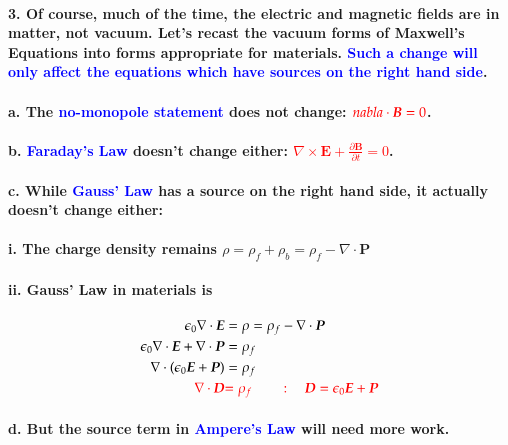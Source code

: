 \documentclass{article}
\begin{document}
\paragraph{3. Of course, much of the time, the electric and magnetic fields are in matter, not vacuum. Let's recast the vacuum forms of Maxwell's Equations into forms appropriate for materials. \textcolor{blue}{Such a change will only affect the equations which have sources on the right hand side}.}
\paragraph{\indent a. The \textcolor{blue}{no-monopole statement} does not change: $\textcolor{red}{nabla\cdot\boldsymbol{B}=0}$.}
\paragraph{\indent b. \textcolor{blue}{Faraday's Law} doesn't change either: \textcolor{red}{$\nabla\times\boldsymbol{E}+\frac{\partial\boldsymbol{B}}{\partial t}=0$}.}
\paragraph{\indent c. While \textcolor{blue}{Gauss' Law} has a source on the right hand side, it actually doesn't change either:}
\paragraph{\indent\indent i. The charge density remains $\rho=\rho_f+\rho_b=\rho_f-\nabla\cdot\boldsymbol{P}$}
\paragraph{\indent\indent ii. Gauss' Law in materials is}
\begin{align*}
    \epsilon_0\nabla\cdot\boldsymbol{E}&=\rho=\rho_f-\nabla\cdot\boldsymbol{P}\\
    \epsilon_0\nabla\cdot\boldsymbol{E}+\nabla\cdot\boldsymbol{P}&=\rho_f\\
    \nabla\cdot(\epsilon_0\boldsymbol{E}+\boldsymbol{P})&=\rho_f\\
    \textcolor{red}{\nabla\cdot\boldsymbol{D}}&\textcolor{red}{=\rho_f\quad\quad:\quad \boldsymbol{D}=\epsilon_0\boldsymbol{E}+\boldsymbol{P}}\\
\end{align*}
\paragraph{\indent d. But the source term in \textcolor{blue}{Ampere's Law} will need more work.}
\end{document}
